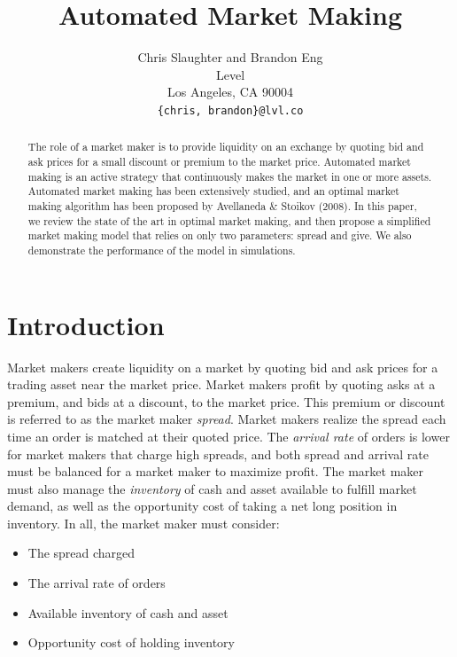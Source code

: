 \documentclass{article}
\title{Automated Market Making}
\author{
  Chris Slaughter and Brandon Eng \\
  Level\\
  Los Angeles, CA 90004 \\
  \texttt{\{chris, brandon\}@lvl.co}
}
\begin{document}
\maketitle

\begin{abstract}

The role of a market maker is to provide liquidity on an exchange by quoting bid and ask prices for a small discount or premium to the market price. Automated market making is an active strategy that continuously makes the market in one or more assets. Automated market making has been extensively studied, and an optimal market making algorithm has been proposed by Avellaneda \& Stoikov (2008). In this paper, we review the state of the art in optimal market making, and then propose a simplified market making model that relies on only two parameters: spread and give. We also demonstrate the performance of the model in simulations.

\end{abstract}


\section{Introduction}
\label{sec:intro}

Market makers create liquidity on a market by quoting bid and ask prices for a trading asset near the market price. Market makers profit by quoting asks at a premium, and bids at a discount, to the market price. This premium or discount is referred to as the market maker \emph{spread}. Market makers realize the spread each time an order is matched at their quoted price. The \emph{arrival rate} of orders is lower for market makers that charge high spreads, and both spread and arrival rate must be balanced for a market maker to maximize profit. The market maker must also manage the \emph{inventory} of cash and asset available to fulfill market demand, as well as the opportunity cost of taking a net long position in inventory. In all, the market maker must consider:

\begin{itemize}
	\item The spread charged
	\item The arrival rate of orders
	\item Available inventory of cash and asset
	\item Opportunity cost of holding inventory
\end{itemize}
\end{document}
